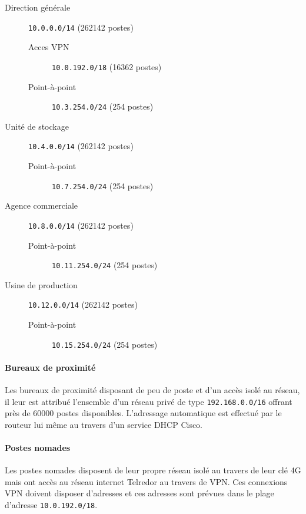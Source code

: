 \documentclass{article}
\newcommand{\tlr}{Telredor\xspace}
\begin{document}
\bigskip

\begin{description}
	\item[Direction générale] \texttt{10.0.0.0/14} (262142 postes)
	\begin{description}
		\item[Acces VPN] \texttt{10.0.192.0/18} (16362 postes)
		\item[Point-à-point] \texttt{10.3.254.0/24} (254 postes)
	\end{description}
	\item[Unité de stockage] \texttt{10.4.0.0/14} (262142 postes)
	\begin{description}
		\item[Point-à-point] \texttt{10.7.254.0/24} (254 postes)
	\end{description}
	\item[Agence commerciale] \texttt{10.8.0.0/14} (262142 postes)
	\begin{description}
		\item[Point-à-point] \texttt{10.11.254.0/24} (254 postes)
	\end{description}
	\item[Usine de production] \texttt{10.12.0.0/14} (262142 postes)
	\begin{description}
		\item[Point-à-point] \texttt{10.15.254.0/24} (254 postes)
	\end{description}
\end{description}

\bigskip

\paragraph{Bureaux de proximité} Les bureaux de proximité disposant de peu de poste et d'un accès isolé au réseau, il leur est attribué l'ensemble d'un réseau privé de type \texttt{192.168.0.0/16} offrant près de 60000 postes disponibles.
L'adressage automatique est effectué par le routeur lui même au travers d'un service DHCP Cisco.

\paragraph{Postes nomades} Les postes nomades disposent de leur propre réseau isolé au travers de leur clé 4G mais ont accès au réseau internet \tlr au travers de VPN.
Ces connexions VPN doivent disposer d'adresses et ces adresses sont prévues dans le plage d'adresse \texttt{10.0.192.0/18}.
\end{document}
